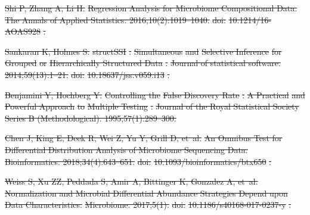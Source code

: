 \documentclass[10pt,letterpaper]{article}
\providecommand{\DIFdeltex}[1]{{\protect\color{red}\sout{#1}}}                      %
\providecommand{\DIFdel}[1]{\texorpdfstring{\DIFdeltex{#1}}{}} %
\begin{document}
\DIFdel{Shi P, Zhang A, Li H.
}%
\DIFdel{Regression Analysis for Microbiome Compositional Data.
}%
\DIFdel{The Annals of Applied Statistics. 2016;10(2):1019--1040.
}%
\DIFdel{doi:}%
\DIFdel{10.1214/16-AOAS928}%
\DIFdel{.
}%

\DIFdel{Sankaran K, Holmes S.
}%
\DIFdel{structSSI}%
\DIFdel{: }%
\DIFdel{Simultaneous}%
\DIFdel{and }%
\DIFdel{Selective Inference}%
\DIFdel{for
  }%
\DIFdel{Grouped}%
\DIFdel{or }%
\DIFdel{Hierarchically Structured Data}%
\DIFdel{.
}%
\DIFdel{Journal of statistical software. 2014;59(13):1--21.
}%
\DIFdel{doi:}%
\DIFdel{10.18637/jss.v059.i13}%
\DIFdel{.
}%

\DIFdel{Benjamini Y, Hochberg Y.
}%
\DIFdel{Controlling the }%
\DIFdel{False Discovery Rate}%
\DIFdel{: }%
\DIFdel{A Practical}%
\DIFdel{and
  }%
\DIFdel{Powerful Approach}%
\DIFdel{to }%
\DIFdel{Multiple Testing}%
\DIFdel{.
}%
\DIFdel{Journal of the Royal Statistical Society Series B (Methodological).
  1995;57(1):289--300.
}%

\DIFdel{Chen J, King E, Deek R, Wei Z, Yu Y, Grill D, et~al.
}%
\DIFdel{An Omnibus Test for Differential Distribution Analysis of Microbiome
  Sequencing Data.
}%
\DIFdel{Bioinformatics. 2018;34(4):643--651.
}%
\DIFdel{doi:}%
\DIFdel{10.1093/bioinformatics/btx650}%
\DIFdel{.
}%

\DIFdel{Weiss S, Xu ZZ, Peddada S, Amir A, Bittinger K, Gonzalez A, et~al.
}%
\DIFdel{Normalization and Microbial Differential Abundance Strategies Depend
  upon Data Characteristics.
}%
\DIFdel{Microbiome. 2017;5(1).
}%
\DIFdel{doi:}%
\DIFdel{10.1186/s40168-017-0237-y}%
\DIFdel{.
}%
\end{document}
